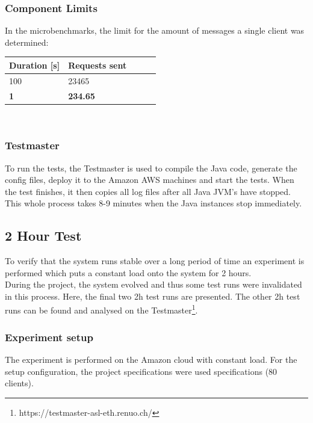 \documentclass[milestone1.tex]{subfiles}
\begin{document}
\subsubsection{Component Limits}

In the microbenchmarks, the limit for the amount of messages a single client was determined:\\

\begin{tabular}{|l|l|r|r|r|}
\hline
Duration [s] & Requests sent \\ \hline
100 & 23465 \\ \hline
\textbf{1} & \textbf{234.65} \\ \hline
\end{tabular}
\\





\subsubsection{Testmaster}

To run the tests, the Testmaster is used to compile the Java code, generate the config files, deploy it to the Amazon AWS machines and start the tests. When the test finishes, it then copies all log files after all Java JVM's have stopped. This whole process takes 8-9 minutes when the Java instances stop immediately.




\subsection{2 Hour Test}



To verify that the system runs stable over a long period of time an experiment is performed which puts a constant load onto the system for 2 hours.\\

During the project, the system evolved and thus some test runs were invalidated in this process. Here, the final two 2h test runs are presented. The other 2h test runs can be found and analysed on the Testmaster\footnote{https://testmaster-asl-eth.renuo.ch/}.\\

\subsubsection{Experiment setup}
The experiment is performed on the Amazon cloud with constant load. For the setup configuration, the project specifications were used specifications (80 clients).\\
\end{document}

